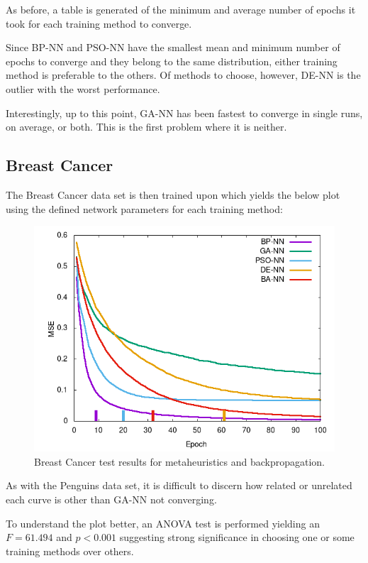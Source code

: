 \documentclass[a4paper,12pt]{article}
\begin{document}
As before, a table is generated of the minimum and average number of epochs it took for each training method to converge.

Since BP-NN and PSO-NN have the smallest mean and minimum number of epochs to converge and they belong to the same distribution, either training method is preferable to the others. Of methods to choose, however, DE-NN is the outlier with the worst performance.

Interestingly, up to this point, GA-NN has been fastest to converge in single runs, on average, or both. This is the first problem where it is neither.

\pagebreak

\subsection{Breast Cancer}

The Breast Cancer data set is then trained upon which yields the below plot using the defined network parameters for each training method:

\begin{figure}[h!]
\centering
\includegraphics[scale=0.60]{images/breast-plot.png}
\caption{Breast Cancer test results for metaheuristics and backpropagation.}
\label{fig:breast}
\end{figure}

As with the Penguins data set, it is difficult to discern how related or unrelated each curve is other than GA-NN not converging.

To understand the plot better, an ANOVA test is performed yielding an $F=61.494$ and $p < 0.001$ suggesting strong significance in choosing one or some training methods over others.
\end{document}
